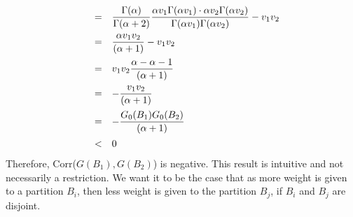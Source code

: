 \documentclass{article}
\def\beginmyfig{\begin{figure}[htbp]\begin{center}}
\def\endmyfig{\end{center}\end{figure}}
\def\ds{\displaystyle}
\begin{document}
\[\begin{array}{rcl}
                            \vspace{.5em}
                        &=& \ds\frac{\Gamma(\alpha)}{\Gamma(\alpha+2)}
                            \ds\frac{\alpha v_1\Gamma(\alpha v_1) \cdot \alpha v_2\Gamma(\alpha v_2)}
                            {\Gamma(\alpha v_1)\Gamma(\alpha v_2)} - v_1 v_2\\
                            \vspace{.5em}
                        &=& \ds\frac{\alpha v_1 v_2}{(\alpha +1)} - v_1 v_2 \\
                            \vspace{.5em}
                        &=& v_1 v_2 \ds\frac{\alpha - \alpha - 1}{(\alpha +1)} \\
                            \vspace{.5em}
                        &=& -\ds\frac{v_1 v_2 }{(\alpha +1)} \\
                            \vspace{.5em}
                        &=& -\ds\frac{G_0(B_1) G_0(B_2) }{(\alpha +1)} \\
                        &<& 0 \\
  \end{array}
\]
Therefore, Corr($G(B_1),G(B_2)$) is negative. This result is intuitive and not necessarily a restriction.
We want it to be the case that as more weight is given to a partition $B_i$, then less weight is
given to the partition $B_j$, if $B_i$ and $B_j$ are disjoint.




\end{document}
